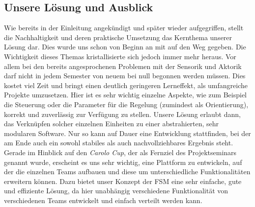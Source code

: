 \subsection{Unsere Lösung und Ausblick}
Wie bereits in der Einleitung angekündigt und später wieder aufgegriffen, stellt die Nachhaltigkeit und deren praktische Umsetzung das Kernthema unserer Lösung dar. Dies wurde uns schon von Beginn an mit auf den Weg gegeben. Die Wichtigkeit dieses Themas kristallisierte sich jedoch immer mehr heraus. Vor allem bei den bereits angesprochenen Problemen mit der Sensorik und Aktorik darf nicht in jedem Semester von neuem bei null begonnen werden müssen. Dies kostet viel Zeit und bringt einen deutlich geringeren Lerneffekt, als umfangreiche Projekte umzusetzen. Hier ist es sehr wichtig einzelne Aspekte, wie zum Beispiel die Steuerung oder die Parameter für die Regelung (zumindest als Orientierung), korrekt und zuverlässig zur Verfügung zu stellen. Unsere Lösung erlaubt dann, das Verknüpfen solcher einzelnen Einheiten zu einer abstrahierten, sehr modularen Software. Nur so kann auf Dauer eine Entwicklung stattfinden, bei der am Ende auch ein sowohl stabiles als auch nachvollziehbares Ergebnis steht.
\newline
\newline
Gerade im Hinblick auf den \textit{Carolo Cup}, der als Fernziel des Projektseminars genannt wurde, erscheint es uns sehr wichtig, eine Plattform zu entwickeln, auf der die einzelnen Teams aufbauen  und diese um unterschiedliche Funktionalitäten erweitern können. Dazu bietet unser Konzept der FSM eine sehr einfache, gute und effiziente Lösung, da hier unabhängig verschiedene Funktionalität von verschiedenen Teams entwickelt und einfach verteilt werden kann.